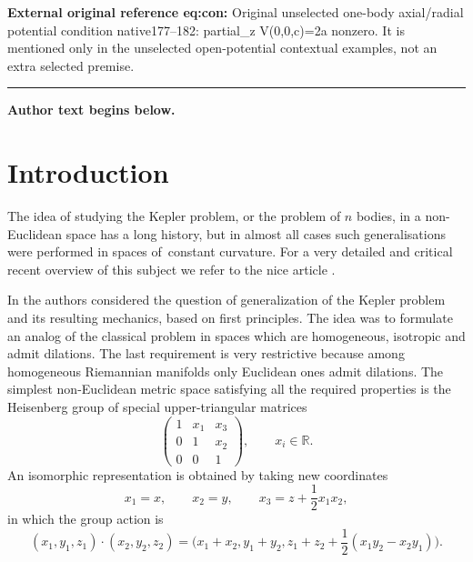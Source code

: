 \documentclass[11pt]{article}
\numberwithin{equation}{section}
\numberwithin{equation}{section}
\begin{document}
\noindent\textbf{External original reference eq:con:} Original unselected one-body axial/radial potential condition native177–182: partial\_z V(0,0,c)=2a nonzero. It is mentioned only in the unselected open-potential contextual examples, not an extra selected premise.\par
\medskip\hrule\medskip\noindent\textbf{Author text begins below.}\par

\section{Introduction}
The idea of studying the Kepler problem, or the problem of $n$ bodies, in a non-Euclidean space has a long history, but in almost all cases such
generalisations were performed in spaces of~con\-stant curvature. For a very detailed and critical recent overview
of this subject we refer to the nice article \cite{borisov:16::}.

In \cite{1} the authors considered the question of generalization of
the Kepler problem and its resulting mechanics, based on first principles. The idea was to
formulate an analog of the classical problem in spaces which are
homogeneous, isotropic and admit dilations. The last requirement is
very restrictive because among homogeneous Riemannian manifolds only
Euclidean ones admit dilations. The simplest non-Euclidean metric
space satisfying all the required properties is the Heisenberg group
of special upper-triangular matrices
\begin{equation*}
 \begin{pmatrix}
 1 & x_1 & x_3 \\ 0 & 1 & x_2 \\ 0 & 0 & 1
 \end{pmatrix}\!,
 \qquad x_i\in\mathbb{R}.
\end{equation*}
An isomorphic representation is obtained by taking new coordinates
\begin{equation*}
 x_1 = x, \qquad x_2 = y, \qquad x_3 = z +\frac12 x_1 x_2,
\end{equation*}
in which the group action is
\begin{equation}
 (x_1,y_1,z_1)\cdot(x_2,y_2,z_2)=\bigg(x_1+x_2,y_1+y_2,z_1+z_2+\frac12(x_1 y_2-x_2 y_1)\bigg).
 \label{groupop}
\end{equation}
\end{document}
